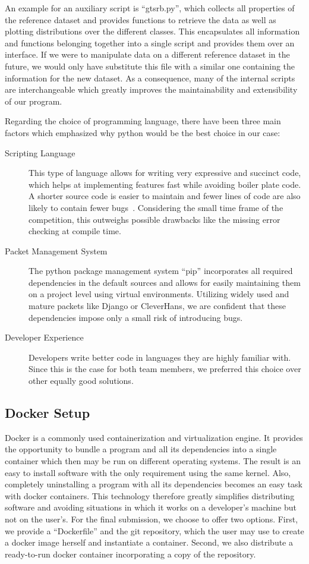 An example for an auxiliary script is \enquote{gtsrb.py}, which collects all properties of the reference dataset and provides functions to retrieve the data as well as plotting distributions over the different classes.
This encapsulates all information and functions belonging together into a single script and provides them over an interface.
If we were to manipulate data on a different reference dataset in the future, we would only have substitute this file with a similar one containing the information for the new dataset.
As a consequence, many of the internal scripts are interchangeable which greatly improves the maintainability and extensibility of our program.

Regarding the choice of programming language, there have been three main factors which emphasized why python would be the best choice in our case:
\begin{description}
	\item[Scripting Language] This type of language allows for writing very expressive and succinct code, which helps at implementing features fast while avoiding boiler plate code. 
	A shorter source code is easier to maintain and fewer lines of code are also likely to contain fewer bugs~\cite{jain2017clairvoyant}. 
	Considering the small time frame of the competition, this outweighs possible drawbacks like the missing error checking at compile time.
	\item[Packet Management System] The python package management system \enquote{pip} incorporates all required dependencies in the default sources and allows for easily maintaining them on a project level using virtual environments. 
	Utilizing widely used  and mature packets like Django or CleverHans, we are confident that these dependencies impose only a small risk of introducing bugs.
	\item[Developer Experience] Developers write better code in languages they are highly familiar with.
	Since this is the case for both team members, we preferred this choice over other equally good solutions.
\end{description}

\subsection{Docker Setup}
Docker is a commonly used containerization and virtualization engine.
It provides the opportunity to bundle a program and all its dependencies into a single container which then may be run on different operating systems.
The result is an easy to install software with the only requirement using the same kernel.
Also, completely uninstalling a program with all its dependencies becomes an easy task with docker containers.
This technology therefore greatly simplifies distributing software and avoiding situations in which it works on a developer's machine but not on the user's.
For the final submission, we choose to offer two options.
First, we provide a \enquote{Dockerfile} and the git repository, which the user may use to create a docker image herself and instantiate a container.
Second, we also distribute a ready-to-run docker container incorporating a copy of the repository.

